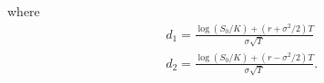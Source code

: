 \documentclass[12pt]{article}
\theoremstyle{plain}
\theoremstyle{definition}
\theoremstyle{remark}
\numberwithin{equation}{section}  %
\begin{document}
where
\begin{equation*}
\begin{split}
	& d_{1} = \frac{\log(S_{0}/K) + (r + \sigma^{2}/2)T}{\sigma \sqrt{T}}
	\\
	 & d_{2} = \frac{\log(S_{0}/K) + (r - \sigma^{2}/2)T}{\sigma \sqrt{T}}.
\end{split}
\end{equation*}


\end{document}
